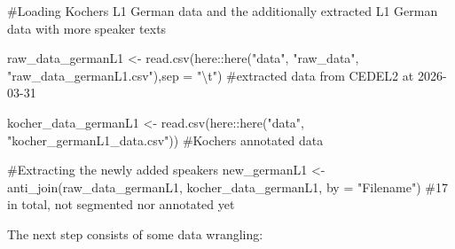 \documentclass[
  letterpaper,
  DIV=11,
  numbers=noendperiod]{scrartcl}
\newenvironment{Shaded}{\begin{snugshade}}{\end{snugshade}}
\newcommand{\AttributeTok}[1]{\textcolor[rgb]{0.40,0.45,0.13}{#1}}
\newcommand{\CommentTok}[1]{\textcolor[rgb]{0.37,0.37,0.37}{#1}}
\newcommand{\FunctionTok}[1]{\textcolor[rgb]{0.28,0.35,0.67}{#1}}
\newcommand{\NormalTok}[1]{\textcolor[rgb]{0.00,0.23,0.31}{#1}}
\newcommand{\OtherTok}[1]{\textcolor[rgb]{0.00,0.23,0.31}{#1}}
\newcommand{\SpecialCharTok}[1]{\textcolor[rgb]{0.37,0.37,0.37}{#1}}
\newcommand{\StringTok}[1]{\textcolor[rgb]{0.13,0.47,0.30}{#1}}
\begin{document}
\begin{Shaded}
\begin{Highlighting}[]
\CommentTok{\#Loading Kocher\textquotesingle{}s L1 German data and the additionally extracted L1 German data with more speaker texts}

\NormalTok{raw\_data\_germanL1 }\OtherTok{\textless{}{-}} \FunctionTok{read.csv}\NormalTok{(here}\SpecialCharTok{::}\FunctionTok{here}\NormalTok{(}\StringTok{"data"}\NormalTok{, }\StringTok{"raw\_data"}\NormalTok{, }\StringTok{"raw\_data\_germanL1.csv"}\NormalTok{),}\AttributeTok{sep =} \StringTok{"}\SpecialCharTok{\textbackslash{}t}\StringTok{"}\NormalTok{) }\CommentTok{\#extracted data from CEDEL2 at 2026{-}03{-}31}

\NormalTok{kocher\_data\_germanL1 }\OtherTok{\textless{}{-}} \FunctionTok{read.csv}\NormalTok{(here}\SpecialCharTok{::}\FunctionTok{here}\NormalTok{(}\StringTok{"data"}\NormalTok{, }\StringTok{"kocher\_germanL1\_data.csv"}\NormalTok{)) }\CommentTok{\#Kocher\textquotesingle{}s annotated data}

\CommentTok{\#Extracting the newly added speakers}
\NormalTok{new\_germanL1 }\OtherTok{\textless{}{-}} \FunctionTok{anti\_join}\NormalTok{(raw\_data\_germanL1, kocher\_data\_germanL1, }
          \AttributeTok{by =} \StringTok{"Filename"}\NormalTok{) }\CommentTok{\#17 in total, not segmented nor annotated yet}
\end{Highlighting}
\end{Shaded}

The next step consists of some data wrangling:
\end{document}
